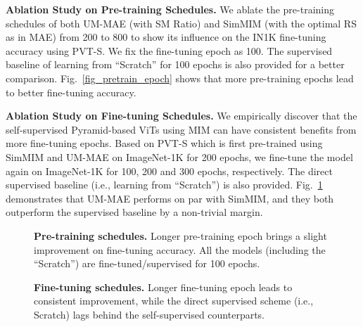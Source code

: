 \documentclass{article}
\begin{document}
\textbf{Ablation Study on Pre-training Schedules.} We ablate the pre-training schedules of both UM-MAE (with  SM Ratio) and SimMIM (with the optimal  RS as in MAE) from 200 to 800 to show its influence on the IN1K fine-tuning accuracy using PVT-S. We fix the fine-tuning epoch as 100. The supervised baseline of learning from ``Scratch'' for 100 epochs is also provided for a better comparison. Fig.~\ref{fig_pretrain_epoch} shows that more pre-training epochs lead to better fine-tuning accuracy.


\textbf{Ablation Study on Fine-tuning Schedules.} We empirically discover that the self-supervised Pyramid-based ViTs using MIM can have consistent benefits from more fine-tuning epochs. Based on PVT-S which is first pre-trained using SimMIM and UM-MAE on ImageNet-1K for 200 epochs, we fine-tune the model again on ImageNet-1K for 100, 200 and 300 epochs, respectively. The direct supervised baseline (i.e., learning from ``Scratch'') is also provided. Fig.~\ref{fig_finetune_epoch} demonstrates that UM-MAE performs on par with SimMIM, and they both outperform the supervised baseline by a non-trivial margin.


\begin{figure}[t]
    \vspace{0pt}
    \centering
    \begin{minipage}[ht]{0.48\textwidth}
    \vspace{0pt}
	\begin{center}
		\setlength{\fboxrule}{0pt}
	\end{center}	
	\vspace{-16pt}
	\caption{\textbf{Pre-training schedules.} Longer pre-training epoch brings a slight improvement on fine-tuning accuracy. All the models (including the ``Scratch'') are fine-tuned/supervised for 100 epochs. 
	}
	\label{fig_pretrain_epoch}
	\vspace{-6pt}
\end{minipage}
\hspace{4pt}
\begin{minipage}[ht]{0.48\textwidth}
    \vspace{0pt}
	\begin{center}
		\setlength{\fboxrule}{0pt}
	\end{center}	
	\vspace{-16pt}
	\caption{\textbf{Fine-tuning schedules.} Longer fine-tuning epoch leads to consistent improvement, while the direct supervised scheme (i.e., Scratch) lags behind the self-supervised counterparts.
	}
	\label{fig_finetune_epoch}
	\vspace{-6pt}
\end{minipage}     \vspace{0pt}
\end{figure}
\end{document}
